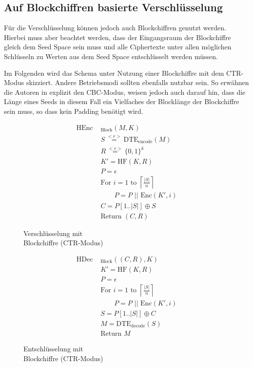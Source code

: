 \subsection{Auf Blockchiffren basierte Verschlüsselung}

Für die Verschlüsselung können jedoch auch Blockchiffren genutzt werden. Hierbei muss aber beachtet werden, dass der Eingangsraum der Blockchiffre gleich dem Seed Space sein muss und alle Ciphertexte unter allen möglichen Schlüsseln zu Werten aus dem Seed Space entschlüsselt werden müssen.

Im Folgenden wird das Schema unter Nutzung einer Blockchiffre mit dem CTR-Modus skizziert. Andere Betriebsmodi sollten ebenfalls nutzbar sein. So erwähnen die Autoren in \cite{EURO2014} explizit den CBC-Modus, weisen jedoch auch darauf hin, dass die Länge eines Seeds in diesem Fall ein Vielfaches der Blocklänge der Blockchiffre sein muss, so dass kein Padding benötigt wird.

\begin{figure}[h]
	\begin{minipage}[b]{0.5\textwidth}
		\begin{align*}
			\text{HEnc }&_{\text{Block}}(M, K)\\
			&S \overset{<r>}{=} \text{DTE}_{\text{encode}}(M)\\ 	%
			&R \overset{<r>}{=} \{0,1\}^k\\	%
			&K' = \text{HF}(K,R)\\ 		%
			&P = \epsilon \\
			&\text{For } i = 1 \text{ to } \left\lceil \frac{|S|}{n} \right\rceil \\
			&\qquad P = P \text{ || Enc}(K',i)\\	%
			&C = P[1 .. |S|] \oplus S\\	%
			&\text{Return } (C,R)
		\end{align*}
		\caption{Verschlüsselung mit \\Blockchiffre (CTR-Modus)}
		\label{fig:BlockEnc}
	\end{minipage}
	\begin{minipage}[b]{0.5\textwidth}
		\begin{align*}
			\text{HDec }&_{\text{Block}}((C,R), K)\\
			&K' = \text{HF}(K,R)\\ 		%
			&P = \epsilon \\
			&\text{For } i = 1 \text{ to } \left\lceil \frac{|S|}{n} \right\rceil \\
			&\qquad P = P \text{ || Enc}(K',i)\\	%
			&S = P[1 .. |S|] \oplus C\\	%
			&M = \text{DTE}_{\text{decode}}(S)\\ 	%
			&\text{Return } M
		\end{align*}
		\caption{Entschlüsselung mit \\Blockchiffre (CTR-Modus)}
		\label{fig:BlockDec}
	\end{minipage}
\end{figure}

